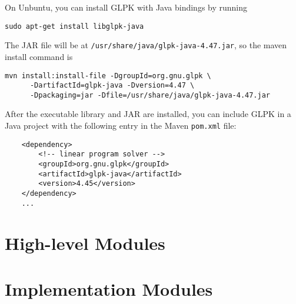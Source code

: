 \documentclass{article}
\begin{document}
On Unbuntu, you can install GLPK with Java bindings by running

\begin{verbatim}
sudo apt-get install libglpk-java
\end{verbatim}

The JAR file will be at \verb+/usr/share/java/glpk-java-4.47.jar+, so the maven
install command is

\begin{verbatim}
mvn install:install-file -DgroupId=org.gnu.glpk \
      -DartifactId=glpk-java -Dversion=4.47 \
      -Dpackaging=jar -Dfile=/usr/share/java/glpk-java-4.47.jar
\end{verbatim}

After the executable library and JAR are installed, you can include GLPK in a Java project with the following entry in the Maven \verb+pom.xml+ file:

\begin{verbatim}
    <dependency>
        <!-- linear program solver -->
        <groupId>org.gnu.glpk</groupId>
        <artifactId>glpk-java</artifactId>
        <version>4.45</version>
    </dependency>
    ...
\end{verbatim}

\section*{High-level Modules}

\section*{Implementation Modules}
\end{document}
